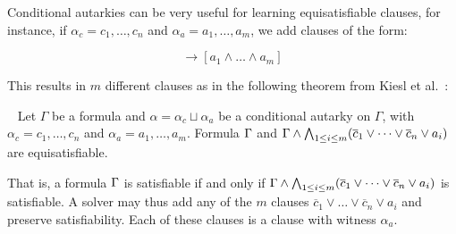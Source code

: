 
Conditional autarkies can be very useful for learning equisatisfiable clauses,
for instance, if $\alpha_c = c_1, \dots, c_n$ and $\alpha_a = a_1, \dots, a_m$,
we add clauses of the form:

\begin{equation*}
    [c_1 \land \dots \land c_n] \rightarrow [a_1 \land \dots \land a_m]
\end{equation*}

This results in $m$ different clauses as in the following theorem from Kiesl et
al.~\cite{conditionalautarkies}:

\begin{theorem}~\label{thm:gbcequisat} Let $\Gamma$ be a formula and $\alpha =
    \alpha_c \sqcup \alpha_a$ be a conditional autarky on $\Gamma$, with
    $\alpha_c = c_1, \dots, c_n$ and $\alpha_a = a_1, \dots, a_m$. Formula
    $\Gamma$ and $\Gamma \land \bigwedge_{1 \leq i \leq m} (\overline{c}_1
    \lor \dots \lor \overline{c}_n \lor a_i)$ are equisatisfiable.
\end{theorem}

That is, a formula $\Gamma$ is satisfiable if and only if $\Gamma \land
\bigwedge_{1 \leq i \leq m} (\overline{c}_1 \lor \dots \lor \overline{c}_n \lor
a_i)$ is satisfiable. A solver may thus add any of the $m$ clauses
$\overline{c}_1 \lor \dots \lor \overline{c}_n \lor a_i$ and preserve
satisfiability. Each of these clauses is a \pr clause with witness $\alpha_a$.



   

